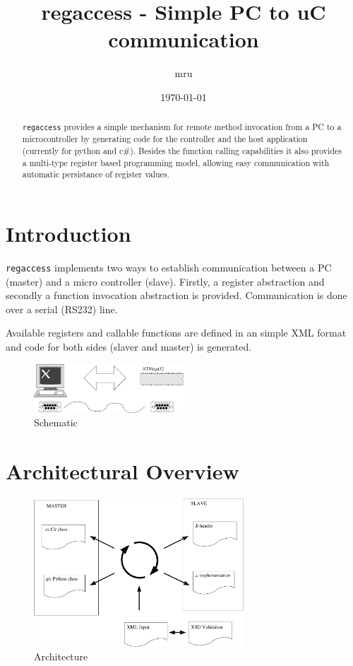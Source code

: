 \documentclass[a4paper,pdftex]{paper}
\title{regaccess - Simple PC to uC communication}
\author{mru}
\date{\today{}}
\def\regaccess{{\tt regaccess}}
\begin{document}
\thispagestyle{empty}
\maketitle{}

\begin{abstract}
  \regaccess{} provides a simple mechanism for remote method
  invocation from a PC to a microcontroller by generating code for the
  controller and the host application (currently for python and c\#).
  Besides the function calling capabilities it also provides a
  multi-type register based programming model, allowing easy
  communication with automatic persistance of register values.
\end{abstract}

\tableofcontents{}
\section{Introduction}
\label{sec:intro}


\regaccess{} implements two ways to establish communication between a
PC (master) and a micro controller (slave).  Firstly, a register
abstraction and secondly a function invocation abstraction is
provided.  Communication is done over a serial (RS232) line.

Available registers and callable functions are defined in an simple
XML format and code for both sides (slaver and master) is generated.

\begin{figure}
  \centering
  \includegraphics[width=0.5\textwidth]{communication.pdf}
  \caption{Schematic}
  \label{fig:schem}
\end{figure}

\section{Architectural Overview}

\begin{figure}
  \centering
  \includegraphics[width=0.7\textwidth]{gen_overview.pdf}
  \caption{Architecture}
  \label{fig:arch}
\end{figure}
\end{document}
